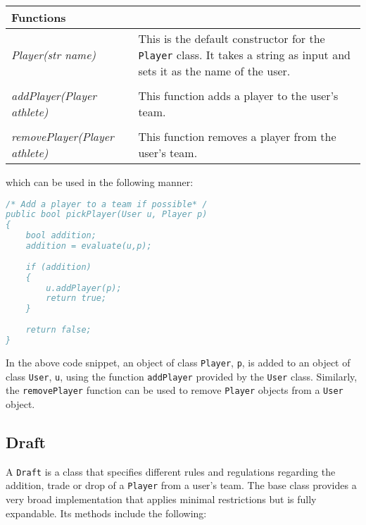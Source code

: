 \documentclass[12pt]{report}
\begin{document}
\begin{flushleft}
\begin{singlespace}
\begin{tabular}{ p{5.5cm} | p{10cm} }
\hline
\textbf{Functions} & \\
\hline
\textit{Player(str name)} & This is the default constructor for the \texttt{Player} class. It takes a string as input and sets it as the name of the user. \\
\\
\textit{addPlayer(Player athlete)} & This function adds a player to the user's team. \\
\\
\textit{removePlayer(Player athlete)} & This function removes a player from the user's team. \\
\hline
\end{tabular}
\end{singlespace}
\end{flushleft}

which can be used in the following manner:

\begin{singlespace}
\begin{lstlisting}[language=Java,label=some-code,caption=Adding a Player]
/* Add a player to a team if possible* /
public bool pickPlayer(User u, Player p)
{
	bool addition;
	addition = evaluate(u,p);
	
	if (addition)
	{
		u.addPlayer(p);
		return true;
	}
	
	return false;
}
\end{lstlisting}
\end{singlespace}

In the above code snippet, an object of class \texttt{Player}, \texttt{p}, is added to an object of class \texttt{User}, \texttt{u}, using the function \texttt{addPlayer} provided by the \texttt{User} class. Similarly, the \texttt{removePlayer} function can be used to remove \texttt{Player} objects from a \texttt{User} object.

\subsection{Draft}

A \texttt{Draft} is a class that specifies different rules and regulations regarding the addition, trade or drop of a \texttt{Player} from a user's team. The base class provides a very broad implementation that applies minimal restrictions but is fully expandable. Its methods include the following:
\end{document}
